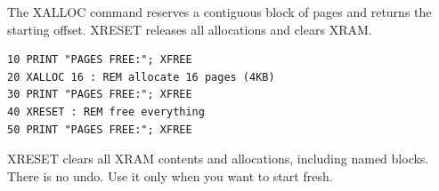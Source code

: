 The XALLOC command reserves a contiguous block of pages and returns the starting
offset.  XRESET releases all allocations and clears XRAM.

\begin{lstlisting}
10 PRINT "PAGES FREE:"; XFREE
20 XALLOC 16 : REM allocate 16 pages (4KB)
30 PRINT "PAGES FREE:"; XFREE
40 XRESET : REM free everything
50 PRINT "PAGES FREE:"; XFREE
\end{lstlisting}

\begin{warningbox}
XRESET clears all XRAM contents and allocations, including named blocks.  There
is no undo.  Use it only when you want to start fresh.
\end{warningbox}
